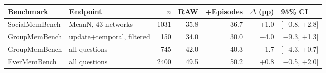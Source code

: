 \begin{tabular}{llrrrrl}
\toprule
Benchmark & Endpoint & $n$ & RAW & +Episodes & $\Delta$ (pp) & 95\% CI \\
\midrule
SocialMemBench & MeanN, 43 networks & 1031 & 35.8 & 36.7 & +1.0 & [$-$0.8, +2.8] \\
GroupMemBench & update+temporal, filtered & 150 & 34.0 & 30.0 & $-$4.0 & [$-$9.3, +1.3] \\
GroupMemBench & all questions & 745 & 42.0 & 40.3 & $-$1.7 & [$-$4.3, +0.7] \\
EverMemBench & all questions & 2400 & 49.5 & 50.2 & +0.8 & [$-$0.5, +2.0] \\
\bottomrule
\end{tabular}
